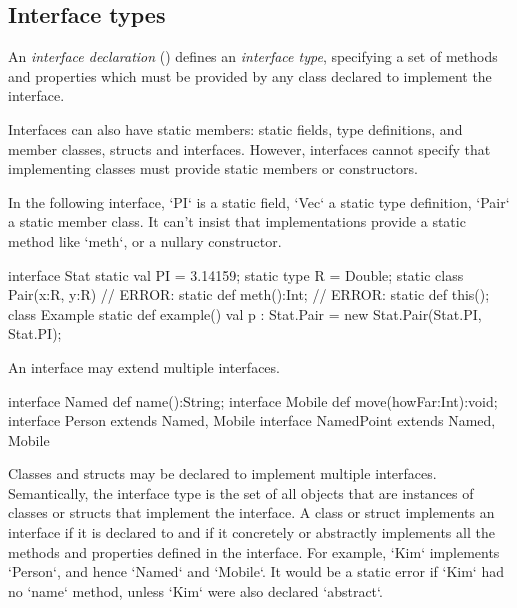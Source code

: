 \subsection{Interface types}
\label{InterfaceTypes}


An {\em interface declaration} () defines an {\em
interface type}, specifying a set of methods 
and properties which must be provided by any class declared to implement the
interface. 


Interfaces can also have static members: static fields, type
definitions, and member classes, structs and interfaces.  However,
interfaces cannot specify that implementing classes must provide
static members or constructors.

\begin{ex}
In the following interface, \xcd`PI` is a static field, 
\xcd`Vec` a static type definition, 
\xcd`Pair` a static member class.
It can't insist that implementations provide a static method 
like \xcd`meth`, or a nullary constructor.
% 
\begin{xten}
interface Stat {
  static val PI = 3.14159; 
  static type R = Double;
  static class Pair(x:R, y:R) {}
  // ERROR: static def meth():Int;
  // ERROR: static def this();
}
class Example {
  static def example() {
     val p : Stat.Pair = new Stat.Pair(Stat.PI, Stat.PI);
  }
}
\end{xten}
%

\end{ex}

An interface may extend multiple interfaces.  
\begin{xten}
interface Named {
  def name():String;
}
interface Mobile {
  def move(howFar:Int):void;
}
interface Person extends Named, Mobile {}
interface NamedPoint extends Named, Mobile {} 
\end{xten}
%


Classes and structs may be declared to implement multiple interfaces. Semantically, the
interface type is the set of all objects that are instances of classes
or structs that
implement the interface. A class or struct implements an interface if it is declared to
and if it concretely or abstractly implements all the methods and properties
defined in the interface. For example, \xcd`Kim` implements
\xcd`Person`, and hence \xcd`Named` and \xcd`Mobile`. It would be a static
error if \xcd`Kim` had no \xcd`name` method, unless \xcd`Kim` were also
declared \xcd`abstract`.

